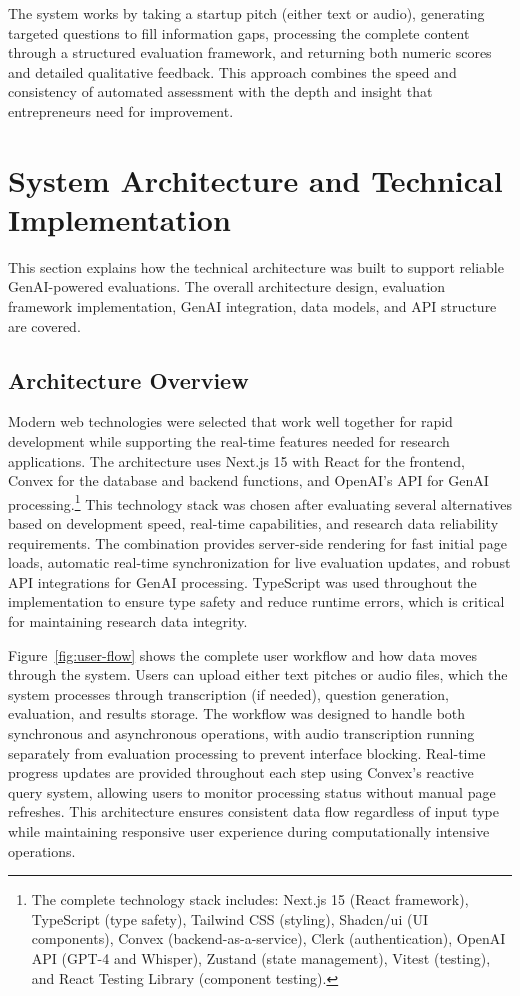 The system works by taking a startup pitch (either text or audio), generating targeted questions to fill information gaps, processing the complete content through a structured evaluation framework, and returning both numeric scores and detailed qualitative feedback. This approach combines the speed and consistency of automated assessment with the depth and insight that entrepreneurs need for improvement.

\section{System Architecture and Technical Implementation} \label{sec:system-design}

This section explains how the technical architecture was built to support reliable GenAI-powered evaluations. The overall architecture design, evaluation framework implementation, GenAI integration, data models, and API structure are covered.

\subsection{Architecture Overview}\label{subsec:architecture-overview}

Modern web technologies were selected that work well together for rapid development while supporting the real-time features needed for research applications. The architecture uses Next.js 15 with React for the frontend, Convex for the database and backend functions, and OpenAI's API for GenAI processing.\footnote{The complete technology stack includes: Next.js 15 (React framework), TypeScript (type safety), Tailwind CSS (styling), Shadcn/ui (UI components), Convex (backend-as-a-service), Clerk (authentication), OpenAI API (GPT-4 and Whisper), Zustand (state management), Vitest (testing), and React Testing Library (component testing).} This technology stack was chosen after evaluating several alternatives based on development speed, real-time capabilities, and research data reliability requirements. The combination provides server-side rendering for fast initial page loads, automatic real-time synchronization for live evaluation updates, and robust API integrations for GenAI processing. TypeScript was used throughout the implementation to ensure type safety and reduce runtime errors, which is critical for maintaining research data integrity.

Figure~\ref{fig:user-flow} shows the complete user workflow and how data moves through the system. Users can upload either text pitches or audio files, which the system processes through transcription (if needed), question generation, evaluation, and results storage. The workflow was designed to handle both synchronous and asynchronous operations, with audio transcription running separately from evaluation processing to prevent interface blocking. Real-time progress updates are provided throughout each step using Convex's reactive query system, allowing users to monitor processing status without manual page refreshes. This architecture ensures consistent data flow regardless of input type while maintaining responsive user experience during computationally intensive operations.

